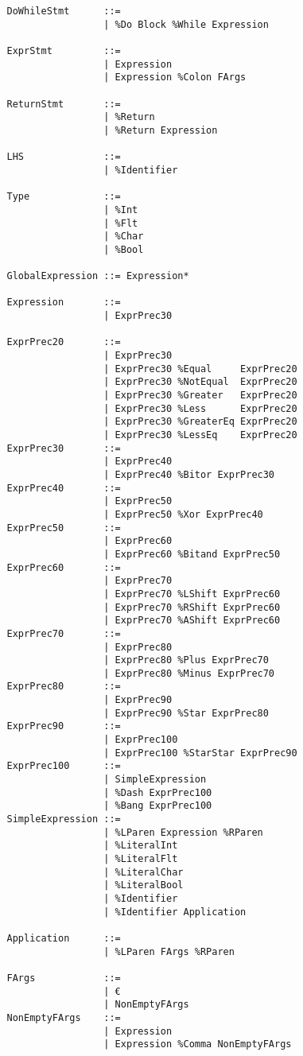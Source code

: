 \documentclass{article}
\begin{document}
\begin{verbatim}
				DoWhileStmt      ::=
				                 | %Do Block %While Expression
				                 
				ExprStmt         ::=
				                 | Expression
				                 | Expression %Colon FArgs
				                 
				ReturnStmt       ::=
				                 | %Return
				                 | %Return Expression
				                 
				LHS              ::=
				                 | %Identifier
				                 
				Type             ::=
				                 | %Int
				                 | %Flt
				                 | %Char
				                 | %Bool
				                 
				GlobalExpression ::= Expression*
			
				Expression       ::=
				                 | ExprPrec30
				
				ExprPrec20       ::= 
				                 | ExprPrec30
				                 | ExprPrec30 %Equal     ExprPrec20
				                 | ExprPrec30 %NotEqual  ExprPrec20
				                 | ExprPrec30 %Greater   ExprPrec20
				                 | ExprPrec30 %Less      ExprPrec20
				                 | ExprPrec30 %GreaterEq ExprPrec20
				                 | ExprPrec30 %LessEq    ExprPrec20
				ExprPrec30       ::=
				                 | ExprPrec40
				                 | ExprPrec40 %Bitor ExprPrec30
				ExprPrec40       ::=
				                 | ExprPrec50
				                 | ExprPrec50 %Xor ExprPrec40
				ExprPrec50       ::=
				                 | ExprPrec60
				                 | ExprPrec60 %Bitand ExprPrec50
				ExprPrec60       ::=
				                 | ExprPrec70
				                 | ExprPrec70 %LShift ExprPrec60
				                 | ExprPrec70 %RShift ExprPrec60
				                 | ExprPrec70 %AShift ExprPrec60
				ExprPrec70       ::=
				                 | ExprPrec80
				                 | ExprPrec80 %Plus ExprPrec70
				                 | ExprPrec80 %Minus ExprPrec70
				ExprPrec80       ::=
				                 | ExprPrec90
				                 | ExprPrec90 %Star ExprPrec80
				ExprPrec90       ::=
				                 | ExprPrec100
				                 | ExprPrec100 %StarStar ExprPrec90
				ExprPrec100      ::=
				                 | SimpleExpression
				                 | %Dash ExprPrec100
				                 | %Bang ExprPrec100
				SimpleExpression ::=
				                 | %LParen Expression %RParen
				                 | %LiteralInt
				                 | %LiteralFlt
				                 | %LiteralChar
				                 | %LiteralBool
				                 | %Identifier
				                 | %Identifier Application
				                 
				Application      ::=
				                 | %LParen FArgs %RParen
				
				FArgs            ::=
				                 | €
				                 | NonEmptyFArgs
				NonEmptyFArgs    ::=
				                 | Expression
				                 | Expression %Comma NonEmptyFArgs
			\end{verbatim}
	
\end{document}
